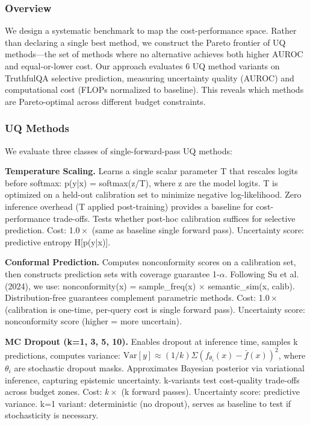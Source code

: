 
\subsubsection{Overview}

We design a systematic benchmark to map the cost-performance space. Rather than declaring a single best method, we construct the Pareto frontier of UQ methods---the set of methods where no alternative achieves both higher AUROC and equal-or-lower cost. Our approach evaluates 6 UQ method variants on TruthfulQA selective prediction, measuring uncertainty quality (AUROC) and computational cost (FLOPs normalized to baseline). This reveals which methods are Pareto-optimal across different budget constraints.

\subsubsection{UQ Methods}

We evaluate three classes of single-forward-pass UQ methods:

\textbf{Temperature Scaling.} Learns a single scalar parameter T that rescales logits before softmax: p(y|x) = softmax(z/T), where z are the model logits. T is optimized on a held-out calibration set to minimize negative log-likelihood. Zero inference overhead (T applied post-training) provides a baseline for cost-performance trade-offs. Tests whether post-hoc calibration suffices for selective prediction. Cost: 1.$0\times$ (same as baseline single forward pass). Uncertainty score: predictive entropy H[p(y|x)].

\textbf{Conformal Prediction.} Computes nonconformity scores on a calibration set, then constructs prediction sets with coverage guarantee 1-$\alpha$. Following Su et al. (2024), we use: nonconformity(x) = sample\_freq(x) $\times$ semantic\_sim(x, calib). Distribution-free guarantees complement parametric methods. Cost: 1.$0\times$ (calibration is one-time, per-query cost is single forward pass). Uncertainty score: nonconformity score (higher = more uncertain).

\textbf{MC Dropout (k=1, 3, 5, 10).} Enables dropout at inference time, samples k predictions, computes variance: $\text{Var}[y] \approx (1/k) \Sigma (f_{\theta_i}(x) - \bar{f}(x))^{2}$, where $\theta_i$ are stochastic dropout masks. Approximates Bayesian posterior via variational inference, capturing epistemic uncertainty. k-variants test cost-quality trade-offs across budget zones. Cost: $k\times$ (k forward passes). Uncertainty score: predictive variance. k=1 variant: deterministic (no dropout), serves as baseline to test if stochasticity is necessary.

